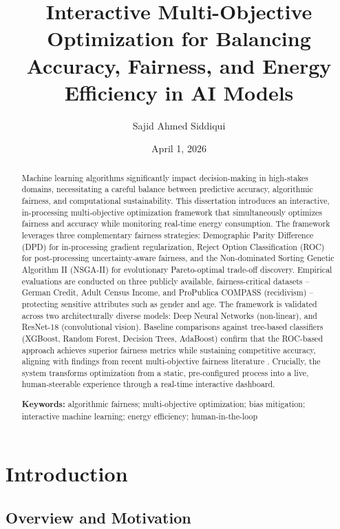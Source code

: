 \documentclass[12pt,a4paper]{article}
\title{Interactive Multi-Objective Optimization for Balancing Accuracy, Fairness, and Energy Efficiency in AI Models}
\author{Sajid Ahmed Siddiqui}
\date{April 1, 2026}
\begin{document}
\maketitle
\newpage
\begin{abstract}
Machine learning algorithms significantly impact decision-making in high-stakes domains, necessitating a careful balance between predictive accuracy, algorithmic fairness, and computational sustainability. This dissertation introduces an interactive, in-processing multi-objective optimization framework that simultaneously optimizes fairness and accuracy while monitoring real-time energy consumption. The framework leverages three complementary fairness strategies: Demographic Parity Difference (DPD) for in-processing gradient regularization, Reject Option Classification (ROC) for post-processing uncertainty-aware fairness, and the Non-dominated Sorting Genetic Algorithm II (NSGA-II) for evolutionary Pareto-optimal trade-off discovery. Empirical evaluations are conducted on three publicly available, fairness-critical datasets -- German Credit, Adult Census Income, and ProPublica COMPASS (recidivism) -- protecting sensitive attributes such as gender and age. The framework is validated across two architecturally diverse models: Deep Neural Networks (non-linear), and ResNet-18 (convolutional vision). Baseline comparisons against tree-based classifiers (XGBoost, Random Forest, Decision Trees, AdaBoost) confirm that the ROC-based approach achieves superior fairness metrics while sustaining competitive accuracy, aligning with findings from recent multi-objective fairness literature \cite{nagpal2024multiobj}. Crucially, the system transforms optimization from a static, pre-configured process into a live, human-steerable experience through a real-time interactive dashboard.

\noindent\textbf{Keywords:} algorithmic fairness; multi-objective optimization; bias mitigation; interactive machine learning; energy efficiency; human-in-the-loop
\end{abstract}
\newpage
\tableofcontents
\newpage

\section{Introduction}

\subsection{Overview and Motivation}
\end{document}
